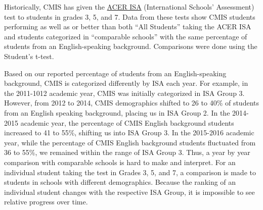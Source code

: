 Historically, CMIS has given the \href{https://drive.google.com/drive/u/0/folders/0B71_pYxcTLo-anRvTzA5NDBGUW8}{ACER ISA} (International Schools’ Assessment) test to students in grades 3, 5, and 7.  Data from these tests show CMIS students performing as well as or better than both “All Students” taking the ACER ISA and students categorized in “comparable schools” with the same percentage of students from an English-speaking background.  Comparisons were done using the Student’s t-test. 



Based on our reported percentage of students from an English-speaking background, CMIS is categorized differently by ISA each year.  For example, in the 2011-1012 academic year, CMIS was initially categorized in ISA Group 3.  However, from 2012 to 2014, CMIS demographics shifted to 26 to 40\% of students from an English speaking background, placing us in ISA Group 2.  In the 2014-2015 academic year, the percentage of CMIS English background students increased to 41 to 55\%, shifting us into ISA Group 3.  In the 2015-2016 academic year, while the percentage of CMIS English background students fluctuated from 36 to 55\%, we remained within the range of ISA Group 3.  Thus, a year by year comparison with comparable schools is hard to make and interpret.  For an individual student taking the test in Grades 3, 5, and 7, a comparison is made to students in schools with different demographics.  Because the ranking of an individual student changes with the respective ISA Group, it is impossible to see relative progress over time.  

